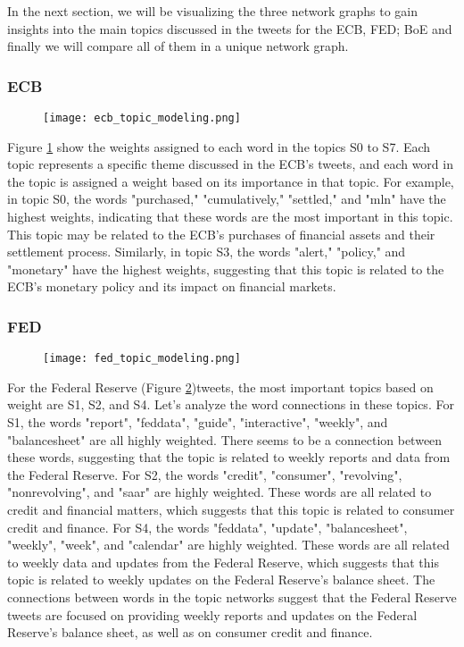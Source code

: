 \documentclass[fleqn,10pt]{SelfArx} %
\begin{document}
In the next section, we will be visualizing the three network graphs to gain insights into the main topics discussed in the tweets for the ECB, FED; BoE and finally we will compare all of them in a unique network graph.

\subsubsection{ECB}

\begin{figure}[ht]\centering
	\texttt{[image: ecb\_topic\_modeling.png]}
	\caption{}
	\label{fig:ecb_topic}
\end{figure}
Figure \ref{fig:ecb_topic} show the weights assigned to each word in the topics S0 to S7. Each topic represents a specific theme discussed in the ECB's tweets, and each word in the topic is assigned a weight based on its importance in that topic. For example, in topic S0, the words "purchased," "cumulatively," "settled," and "mln" have the highest weights, indicating that these words are the most important in this topic. This topic may be related to the ECB's purchases of financial assets and their settlement process. Similarly, in topic S3, the words "alert," "policy," and "monetary" have the highest weights, suggesting that this topic is related to the ECB's monetary policy and its impact on financial markets.

\subsubsection{FED}

\begin{figure}[ht]\centering
	\texttt{[image: fed\_topic\_modeling.png]}
	\caption{}
	\label{fig:fed_topic}
\end{figure}

For the Federal Reserve (Figure \ref{fig:fed_topic})tweets, the most important topics based on weight are S1, S2, and S4. Let's analyze the word connections in these topics. For S1, the words "report", "feddata", "guide", "interactive", "weekly", and "balancesheet" are all highly weighted. There seems to be a connection between these words, suggesting that the topic is related to weekly reports and data from the Federal Reserve. For S2, the words "credit", "consumer", "revolving", "nonrevolving", and "saar" are highly weighted. These words are all related to credit and financial matters, which suggests that this topic is related to consumer credit and finance. For S4, the words "feddata", "update", "balancesheet", "weekly", "week", and "calendar" are highly weighted. These words are all related to weekly data and updates from the Federal Reserve, which suggests that this topic is related to weekly updates on the Federal Reserve's balance sheet.
The connections between words in the topic networks suggest that the Federal Reserve tweets are focused on providing weekly reports and updates on the Federal Reserve's balance sheet, as well as on consumer credit and finance.
\end{document}
